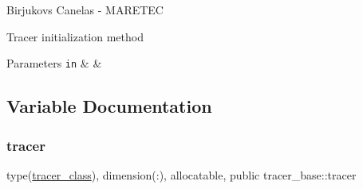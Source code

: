Birjukovs Canelas -\/ M\+A\+R\+E\+T\+EC 

Tracer initialization method 
\begin{DoxyParams}[1]{Parameters}
\mbox{\tt in}  & {\em } & \\
\hline
\end{DoxyParams}


\subsection{Variable Documentation}
\mbox{\label{namespacetracer__base_a7f839546575f08e3b944dafdf5e0b2d2}} 
\subsubsection{\texorpdfstring{tracer}{tracer}}
{\footnotesize\ttfamily type(\mbox{\hyperlink{structtracer__base_1_1tracer__class}{tracer\+\_\+class}}), dimension(\+:), allocatable, public tracer\+\_\+base\+::tracer}

